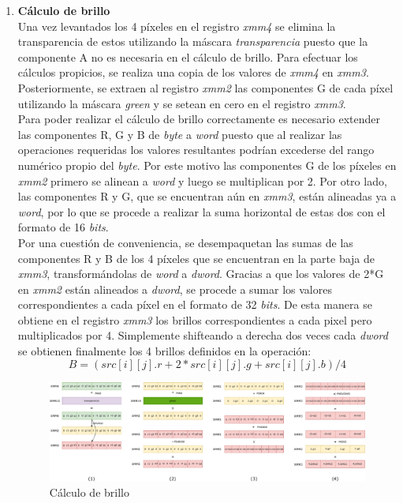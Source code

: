 \documentclass[a4paper]{article}
\begin{document}
 \begin{enumerate}
 	\item \textbf{Cálculo de brillo}\\
 	Una vez levantados los 4 píxeles en el registro \textit{xmm4} se elimina la transparencia de estos utilizando la máscara \textit{transparencia} puesto que la componente A no es necesaria en el cálculo de brillo. Para efectuar los cálculos propicios, se realiza una copia de los valores de \textit{xmm4} en \textit{xmm3}. Posteriormente, se extraen al registro \textit{xmm2} las componentes G de cada píxel utilizando la máscara \textit{green} y se setean en cero en el registro \textit{xmm3}.\\
 	Para poder realizar el cálculo de brillo correctamente es necesario extender las componentes R, G y B de \textit{byte} a \textit{word} puesto que al realizar las operaciones requeridas los valores resultantes podrían excederse del rango numérico propio del \textit{byte}. Por este motivo las componentes G de los píxeles en \textit{xmm2} primero se alinean a \textit{word} y luego se multiplican por 2. Por otro lado, las componentes R y G, que se encuentran aún en \textit{xmm3}, están alineadas ya a \textit{word}, por lo que se procede a realizar la suma horizontal de estas dos con el formato de 16 \textit{bits}.\\
 	Por una cuestión de conveniencia, se desempaquetan las sumas de las componentes R y B de los 4 píxeles que se encuentran en la parte baja de \textit{xmm3}, transformándolas de \textit{word} a \textit{dword}.  Gracias a que los valores de 2*G  en \textit{xmm2} están alineados a \textit{dword}, se procede a sumar los valores correspondientes a cada píxel en el formato de 32 \textit{bits}. De esta manera se obtiene en el registro \textit{xmm3} los brillos correspondientes a cada pixel pero multiplicados por 4. Simplemente shifteando a derecha dos veces cada \textit{dword} se obtienen finalmente los 4 brillos definidos en la operación: 
 	 \begin{equation}
 	B = (src[i][j].r + 2 * src[i][j].g + src[i][j].b)/4 
 	\end{equation}
 	 
\begin{figure}[h!]
	\centering
 	\includegraphics[scale=0.35]{img/ReforzarBrillo2.pdf}
 	\caption{Cálculo de brillo}
 \end{figure}
 

\end{enumerate}
\end{document}
